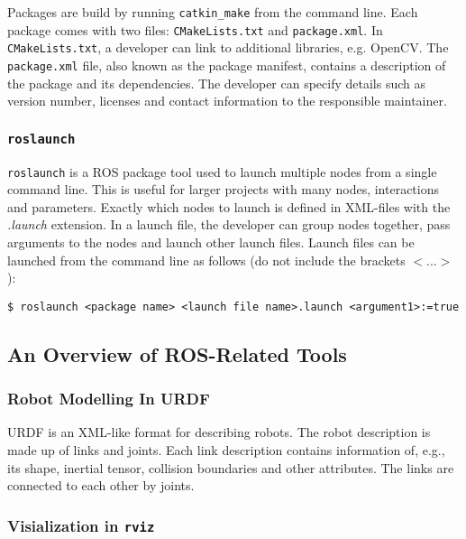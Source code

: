 Packages are build by running \texttt{catkin\_make} from the command line. Each package comes with two files: \texttt{CMakeLists.txt} and \texttt{package.xml}. In \texttt{CMakeLists.txt}, a developer can link to additional libraries, e.g. \ac{OpenCV}. The \texttt{package.xml} file, also known as the package manifest, contains a description of the package and its dependencies. The developer can specify details such as version number, licenses and contact information to the responsible maintainer.

\subsubsection{\texttt{roslaunch}}

\texttt{roslaunch}\cite{ROS_launch} is a \ac{ROS} package tool used to launch multiple nodes from a single command line. This is useful for larger projects with many nodes, interactions and parameters. Exactly which nodes to launch is defined in XML-files with the \textit{.launch} extension. In a launch file, the developer can group nodes together, pass arguments to the nodes and launch other launch files. Launch files can be launched from the command line as follows (do not include the brackets $<...>$):

\begin{verbatim}
$ roslaunch <package name> <launch file name>.launch <argument1>:=true
\end{verbatim}

\subsection{An Overview of ROS-Related Tools}

\subsubsection{Robot Modelling In URDF}

\ac{URDF} is an XML-like format for describing robots. The robot description is made up of links and joints. Each link description contains information of, e.g., its shape, inertial tensor, collision boundaries and other attributes. The links are connected to each other by joints.

\subsubsection{Visialization in \texttt{rviz}}

